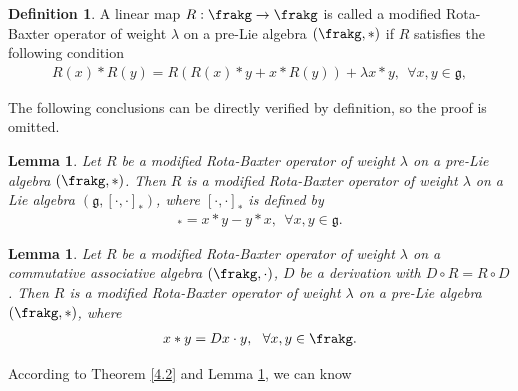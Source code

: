 \documentclass[12pt]{amsart}
\newtheorem{lem}[theorem]{Lemma}
\theoremstyle{definition}
\newtheorem{defn}[theorem]{Definition}
\begin{document}
\begin{defn} \cite{GL25} A linear map $R: \frakg\rightarrow \frakg$ is called a modified Rota-Baxter operator of weight $\lambda$ on a pre-Lie algebra $(\frakg, \ast)$ if $R$ satisfies the following condition
\begin{align*}
 R(x)\ast R(y) = R(R(x)\ast y + x\ast R(y))+\lambda x\ast y, \ \ \forall x, y \in \mathfrak{g},
\end{align*}
\end{defn}

The following conclusions can be directly verified by definition, so the proof is omitted.


\begin{lem}\label{4.7} Let $R$ be a modified Rota-Baxter operator of weight $\lambda$ on a pre-Lie algebra $(\frakg, \ast)$. Then $R$ is a modified Rota-Baxter operator of weight $\lambda$ on a Lie algebra $(\mathfrak{g},[\cdot, \cdot]_\ast)$, where $[\cdot, \cdot]_\ast$ is defined by
\begin{align*}
[x, y]_\ast=x\ast y-y\ast x, \ \ \forall x, y \in \mathfrak{g}.
\end{align*}
\end{lem}
\begin{lem}Let $R$ be a modified Rota-Baxter operator of weight $\lambda$ on a commutative associative algebra $(\frakg, \cdot)$,  $D$ be a derivation with $D\circ R=R\circ D$. Then  $R$ is a modified Rota-Baxter operator of weight $\lambda$ on a pre-Lie algebra $(\frakg, \ast)$,  where
\begin{align*}
x\ast y=Dx\cdot y, \ \ \forall x, y \in \frakg.
\end{align*}
\end{lem}

According to Theorem \ref{4.2} and Lemma \ref{4.7}, we can know
\end{document}
